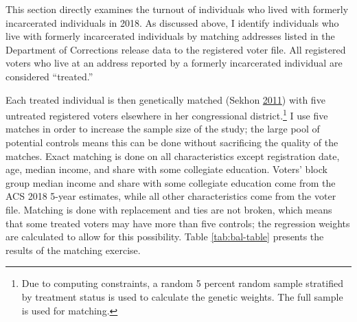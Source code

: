 \documentclass[
  12pt,
]{article}
\begin{document}
This section directly examines the turnout of individuals who lived with formerly incarcerated individuals in 2018. As discussed above, I identify individuals who live with formerly incarcerated individuals by matching addresses listed in the Department of Corrections release data to the registered voter file. All registered voters who live at an address reported by a formerly incarcerated individual are considered ``treated.''

Each treated individual is then genetically matched (Sekhon \protect\hyperlink{ref-Sekhon2011}{2011}) with five untreated registered voters elsewhere in her congressional district.\footnote{Due to computing constraints, a random 5 percent random sample stratified by treatment status is used to calculate the genetic weights. The full sample is used for matching.} I use five matches in order to increase the sample size of the study; the large pool of potential controls means this can be done without sacrificing the quality of the matches. Exact matching is done on all characteristics except registration date, age, median income, and share with some collegiate education. Voters' block group median income and share with some collegiate education come from the ACS 2018 5-year estimates, while all other characteristics come from the voter file. Matching is done with replacement and ties are not broken, which means that some treated voters may have more than five controls; the regression weights are calculated to allow for this possibility. Table \ref{tab:bal-table} presents the results of the matching exercise.
\end{document}
